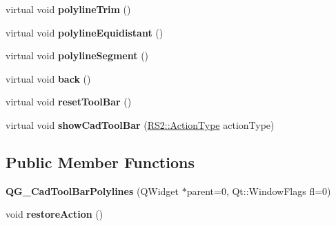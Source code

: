 \begin{DoxyCompactItemize}
\item 
\hypertarget{classQG__CadToolBarPolylines_a00fe55f8b957de2833f93cddf5e38ab7}{virtual void {\bfseries polyline\-Trim} ()}\label{classQG__CadToolBarPolylines_a00fe55f8b957de2833f93cddf5e38ab7}

\item 
\hypertarget{classQG__CadToolBarPolylines_ac58642af67cfeceb90168fbe92cf93fa}{virtual void {\bfseries polyline\-Equidistant} ()}\label{classQG__CadToolBarPolylines_ac58642af67cfeceb90168fbe92cf93fa}

\item 
\hypertarget{classQG__CadToolBarPolylines_ab4209f8e842eb8adf192c42e7fd2e85c}{virtual void {\bfseries polyline\-Segment} ()}\label{classQG__CadToolBarPolylines_ab4209f8e842eb8adf192c42e7fd2e85c}

\item 
\hypertarget{classQG__CadToolBarPolylines_a3c105851103164be00b42d82e73a1f6c}{virtual void {\bfseries back} ()}\label{classQG__CadToolBarPolylines_a3c105851103164be00b42d82e73a1f6c}

\item 
\hypertarget{classQG__CadToolBarPolylines_a43073cb6eff7a6ab776934f12b9602ac}{virtual void {\bfseries reset\-Tool\-Bar} ()}\label{classQG__CadToolBarPolylines_a43073cb6eff7a6ab776934f12b9602ac}

\item 
\hypertarget{classQG__CadToolBarPolylines_aa0d042dab3bda64ffedb0db5df4b3926}{virtual void {\bfseries show\-Cad\-Tool\-Bar} (\hyperlink{classRS2_afe3523e0bc41fd637b892321cfc4b9d7}{R\-S2\-::\-Action\-Type} action\-Type)}\label{classQG__CadToolBarPolylines_aa0d042dab3bda64ffedb0db5df4b3926}

\end{DoxyCompactItemize}
\subsection*{Public Member Functions}
\begin{DoxyCompactItemize}
\item 
\hypertarget{classQG__CadToolBarPolylines_a5d4b0793d9a0d70efed70a7056cd5d3e}{{\bfseries Q\-G\-\_\-\-Cad\-Tool\-Bar\-Polylines} (Q\-Widget $\ast$parent=0, Qt\-::\-Window\-Flags fl=0)}\label{classQG__CadToolBarPolylines_a5d4b0793d9a0d70efed70a7056cd5d3e}

\item 
\hypertarget{classQG__CadToolBarPolylines_a68ef39ff153ac8868fb0bce0c80f7128}{void {\bfseries restore\-Action} ()}\label{classQG__CadToolBarPolylines_a68ef39ff153ac8868fb0bce0c80f7128}

\end{DoxyCompactItemize}
